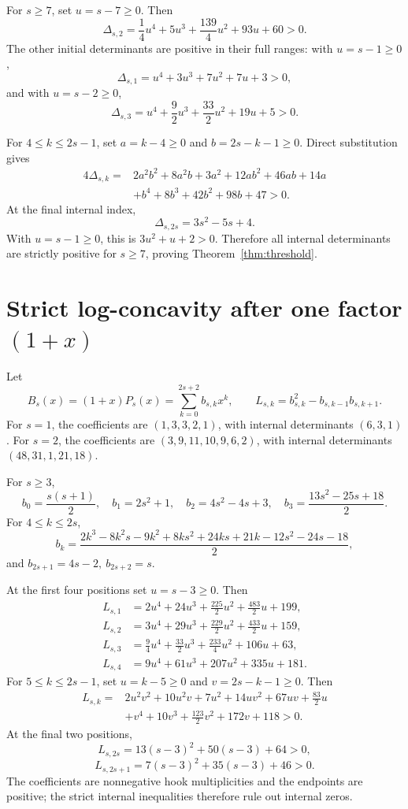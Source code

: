 \documentclass[11pt]{amsart}
\begin{document}
For \(s\ge7\), set \(u=s-7\ge0\). Then
\[
\Delta_{s,2}
=\frac14u^4+5u^3+\frac{139}{4}u^2+93u+60>0.
\]
The other initial determinants are positive in their full ranges:
with \(u=s-1\ge0\),
\[
\Delta_{s,1}=u^4+3u^3+7u^2+7u+3>0,
\]
and with \(u=s-2\ge0\),
\[
\Delta_{s,3}=u^4+\frac92u^3+\frac{33}{2}u^2+19u+5>0.
\]

For \(4\le k\le2s-1\), set \(a=k-4\ge0\) and \(b=2s-k-1\ge0\). Direct substitution gives
\begin{align*}
4\Delta_{s,k}
={}&2a^2b^2+8a^2b+3a^2+12ab^2+46ab+14a\\
&+b^4+8b^3+42b^2+98b+47>0.
\end{align*}
At the final internal index,
\[
\Delta_{s,2s}=3s^2-5s+4.
\]
With \(u=s-1\ge0\), this is \(3u^2+u+2>0\). Therefore all internal determinants are strictly positive for \(s\ge7\), proving Theorem~\ref{thm:threshold}.

\section{Strict log-concavity after one factor \texorpdfstring{\((1+x)\)}{(1+x)}}
Let
\[
B_s(x)=(1+x)P_s(x)=\sum_{k=0}^{2s+2}b_{s,k}x^k,
\qquad
L_{s,k}=b_{s,k}^2-b_{s,k-1}b_{s,k+1}.
\]
For \(s=1\), the coefficients are \((1,3,3,2,1)\), with internal determinants \((6,3,1)\). For \(s=2\), the coefficients are \((3,9,11,10,9,6,2)\), with internal determinants \((48,31,1,21,18)\).

For \(s\ge3\),
\[
b_0=\frac{s(s+1)}2,\quad b_1=2s^2+1,\quad b_2=4s^2-4s+3,\quad
b_3=\frac{13s^2-25s+18}{2}.
\]
For \(4\le k\le2s\),
\[
b_k=
\frac{2k^3-8k^2s-9k^2+8ks^2+24ks+21k-12s^2-24s-18}{2},
\]
and \(b_{2s+1}=4s-2,\ b_{2s+2}=s\).

At the first four positions set \(u=s-3\ge0\). Then
\begin{align*}
L_{s,1}&=2u^4+24u^3+\tfrac{225}2u^2+\tfrac{483}2u+199,\\
L_{s,2}&=3u^4+29u^3+\tfrac{229}2u^2+\tfrac{433}2u+159,\\
L_{s,3}&=\tfrac94u^4+\tfrac{33}2u^3+\tfrac{233}4u^2+106u+63,\\
L_{s,4}&=9u^4+61u^3+207u^2+335u+181.
\end{align*}
For \(5\le k\le2s-1\), set \(u=k-5\ge0\) and \(v=2s-k-1\ge0\). Then
\begin{align*}
L_{s,k}
={}&2u^2v^2+10u^2v+7u^2+14uv^2+67uv+\tfrac{83}2u\\
&+v^4+10v^3+\tfrac{123}2v^2+172v+118>0.
\end{align*}
At the final two positions,
\[
L_{s,2s}=13(s-3)^2+50(s-3)+64>0,
\]
\[
L_{s,2s+1}=7(s-3)^2+35(s-3)+46>0.
\]
The coefficients are nonnegative hook multiplicities and the endpoints are positive; the strict internal inequalities therefore rule out internal zeros.
\end{document}
